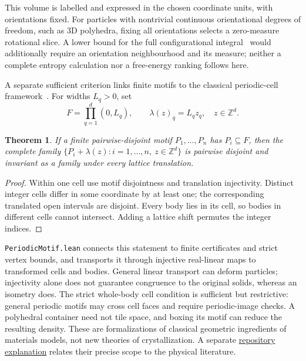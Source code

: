 \documentclass[11pt,a4paper]{article}
\newcommand{\code}[1]{\texttt{\nolinkurl{#1}}}
\newtheorem{theorem}{Theorem}
\begin{document}
This volume is labelled and expressed in the chosen coordinate units, with
orientations fixed. For particles with nontrivial continuous orientational
degrees of freedom, such as 3D polyhedra, fixing all orientations selects a
zero-measure rotational slice. A lower bound for the full configurational integral~\cite{vananders2014}
would additionally require an orientation neighbourhood and its measure; neither
a complete entropy calculation nor a free-energy ranking follows here.

A separate sufficient criterion links finite motifs to the classical
periodic-cell framework~\cite{torquato2009}. For widths $L_q>0$, set
\[
F=\prod_{q=1}^d(0,L_q),\qquad
\lambda(z)_q=L_qz_q,\quad z\in\mathbb Z^d.
\]
\begin{theorem}\label{thm:periodicmotif}
If a finite pairwise-disjoint motif $P_1,\ldots,P_n$ has $P_i\subseteq F$,
then the complete family $\{P_i+\lambda(z):i=1,\ldots,n,\ z\in\mathbb Z^d\}$
is pairwise disjoint and invariant as a family under every lattice translation.
\end{theorem}
\begin{proof}
Within one cell use motif disjointness and translation injectivity. Distinct
integer cells differ in some coordinate by at least one; the corresponding
translated open intervals are disjoint. Every body lies in its cell, so bodies
in different cells cannot intersect. Adding a lattice shift permutes the
integer indices.
\end{proof}
\code{PeriodicMotif.lean} connects this statement to finite certificates and
strict vertex bounds, and transports it through injective real-linear maps to
transformed cells and bodies. General linear transport can deform particles;
injectivity alone does not guarantee congruence to the original solids, whereas
an isometry does. The strict whole-body cell condition is sufficient but restrictive:
general periodic motifs may cross cell faces and require periodic-image checks.
A polyhedral container need not tile space, and boxing its motif can reduce the
resulting density. These are formalizations of classical geometric ingredients
of materials models, not new theories of crystallization. A separate
\href{https://github.com/alejandrozu/platonic-packing/blob/main/docs/MATERIALS_FORMALIZATION.md}{repository explanation}
relates their precise scope to the physical literature.
\end{document}
